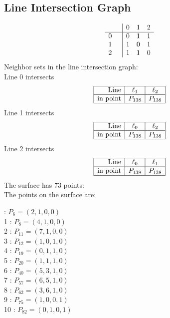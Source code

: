 \documentclass{article}
\begin{document}
{\subsection*{Line Intersection Graph}
{\arraycolsep=1pt
$$
\begin{array}{rr|*{3}r}
 &  & 0 & 1 & 2\\
\hline
0 &  & 0 & 1 & 1\\
1 &  & 1 & 0 & 1\\
2 &  & 1 & 1 & 0\\
\end{array}
$$
}%
Neighbor sets in the line intersection graph:\\
Line 0 intersects 
$$
\begin{array}{|r*{2}{|c}|}
\hline
\mbox{Line}  & \ell_{1} & \ell_{2}\\
\hline
\mbox{in point}  & P_{138} & P_{138}\\
\hline
\end{array}
$$
Line 1 intersects 
$$
\begin{array}{|r*{2}{|c}|}
\hline
\mbox{Line}  & \ell_{0} & \ell_{2}\\
\hline
\mbox{in point}  & P_{138} & P_{138}\\
\hline
\end{array}
$$
Line 2 intersects 
$$
\begin{array}{|r*{2}{|c}|}
\hline
\mbox{Line}  & \ell_{0} & \ell_{1}\\
\hline
\mbox{in point}  & P_{138} & P_{138}\\
\hline
\end{array}
$$
The surface has 73 points:\\
The points on the surface are:\\
\begin{multicols}{3}
 : $P_{6}=( 2, 1, 0, 0 )$\\
1 : $P_{8}=( 4, 1, 0, 0 )$\\
2 : $P_{11}=( 7, 1, 0, 0 )$\\
3 : $P_{12}=( 1, 0, 1, 0 )$\\
4 : $P_{19}=( 0, 1, 1, 0 )$\\
5 : $P_{20}=( 1, 1, 1, 0 )$\\
6 : $P_{40}=( 5, 3, 1, 0 )$\\
7 : $P_{57}=( 6, 5, 1, 0 )$\\
8 : $P_{62}=( 3, 6, 1, 0 )$\\
9 : $P_{75}=( 1, 0, 0, 1 )$\\
10 : $P_{82}=( 0, 1, 0, 1 )$\\

\end{multicols}}
\end{document}
